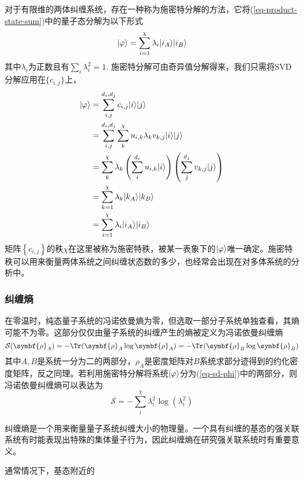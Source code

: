 对于有限维的两体纠缠系统，存在一种称为施密特分解的方法，它将(\ref{eq-product-state-sum})中的量子态分解为以下形式
\begin{equation}\label{eq-sd-phi}
\lvert\varphi\rangle=\sum_{i=1}^{\chi} \lambda_i \lvert i_A\rangle\lvert i_B\rangle
\end{equation}
其中$\lambda_i$为正数且有$\sum_i \lambda_i^2 = 1$. 施密特分解可由奇异值分解得来，我们只需将SVD分解应用在$\{c_{i,j}\}$上，
\begin{align}
	\lvert\varphi\rangle &= \sum_{i,j}^{d_i,d_j} c_{i,j}\lvert i\rangle\lvert j\rangle \\
		 &= \sum_{i,j}^{d_i,d_j} \sum_k^\chi u_{i,k} \lambda_{k} v_{k,j} \lvert i\rangle\lvert j\rangle\\
		 &= \sum_k^\chi \lambda_k \left( \sum_i^{d_i}u_{i,k}\lvert i\rangle \right) \left( \sum_j^{d_j}v_{k,j}\lvert j\rangle \right)\\
		 &= \sum_{k=1}^{\chi} \lambda_k \lvert k_A\rangle\lvert k_B\rangle\\
		 &= \sum_{i=1}^{\chi} \lambda_i \lvert i_A\rangle\lvert i_B\rangle
\end{align}
矩阵$\left\{c_{i,j}\right\}$的秩$\chi$在这里被称为施密特秩，被某一表象下的$\lvert\varphi\rangle$唯一确定。施密特秩可以用来衡量两体系统之间纠缠状态数的多少，也经常会出现在对多体系统的分析中。

\subsubsection{纠缠熵}

在零温时，纯态量子系统的冯诺依曼熵为零，但选取一部分子系统单独查看，其熵可能不为零。这部分仅仅由量子系统的纠缠产生的熵被定义为冯诺依曼纠缠熵\cite{eisertColloquiumAreaLaws2010}
\begin{equation}
\mathcal{S}(\symbf{\rho}_A) = -\Tr(\symbf{\rho}_A\log\symbf{\rho}_A) = -\Tr(\symbf{\rho}_B\log\symbf{\rho}_B)
\end{equation}
其中$A,B$是系统一分为二的两部分，$\rho_A$是密度矩阵对$B$系统求部分迹得到的约化密度矩阵，反之同理。若利用施密特分解将系统$\lvert\varphi\rangle$分为(\ref{eq-sd-phi})中的两部分，则冯诺依曼纠缠熵可以表达为
\begin{equation}
\mathcal{S} = -\sum_i^\chi \lambda_i^2\log\left(\lambda_i^2\right)
\end{equation}

纠缠熵是一个用来衡量量子系统纠缠大小的物理量。一个具有纠缠的基态的强关联系统有时能表现出特殊的集体量子行为\cite{vidalEntanglementQuantumCritical2003}，因此纠缠熵在研究强关联系统时有重要意义。

通常情况下，基态附近的


